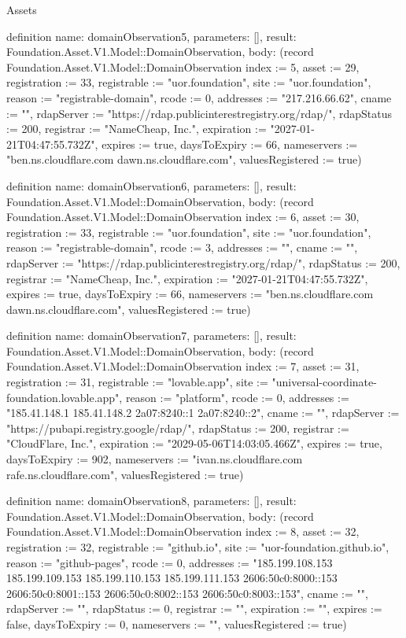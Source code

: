 \begin{lexlean}{Assets}
\begin{semanticmodule}
definition{
  name: domainObservation5,
  parameters: [],
  result: Foundation.Asset.V1.Model::DomainObservation,
  body: (record Foundation.Asset.V1.Model::DomainObservation {index := 5, asset := 29, registration := 33, registrable := "uor.foundation", site := "uor.foundation", reason := "registrable-domain", rcode := 0, addresses := "217.216.66.62", cname := "", rdapServer := "https://rdap.publicinterestregistry.org/rdap/", rdapStatus := 200, registrar := "NameCheap, Inc.", expiration := "2027-01-21T04:47:55.732Z", expires := true, daysToExpiry := 66, nameservers := "ben.ns.cloudflare.com dawn.ns.cloudflare.com", valuesRegistered := true})
}

definition{
  name: domainObservation6,
  parameters: [],
  result: Foundation.Asset.V1.Model::DomainObservation,
  body: (record Foundation.Asset.V1.Model::DomainObservation {index := 6, asset := 30, registration := 33, registrable := "uor.foundation", site := "uor.foundation", reason := "registrable-domain", rcode := 3, addresses := "", cname := "", rdapServer := "https://rdap.publicinterestregistry.org/rdap/", rdapStatus := 200, registrar := "NameCheap, Inc.", expiration := "2027-01-21T04:47:55.732Z", expires := true, daysToExpiry := 66, nameservers := "ben.ns.cloudflare.com dawn.ns.cloudflare.com", valuesRegistered := true})
}

definition{
  name: domainObservation7,
  parameters: [],
  result: Foundation.Asset.V1.Model::DomainObservation,
  body: (record Foundation.Asset.V1.Model::DomainObservation {index := 7, asset := 31, registration := 31, registrable := "lovable.app", site := "universal-coordinate-foundation.lovable.app", reason := "platform", rcode := 0, addresses := "185.41.148.1 185.41.148.2 2a07:8240::1 2a07:8240::2", cname := "", rdapServer := "https://pubapi.registry.google/rdap/", rdapStatus := 200, registrar := "CloudFlare, Inc.", expiration := "2029-05-06T14:03:05.466Z", expires := true, daysToExpiry := 902, nameservers := "ivan.ns.cloudflare.com rafe.ns.cloudflare.com", valuesRegistered := true})
}

definition{
  name: domainObservation8,
  parameters: [],
  result: Foundation.Asset.V1.Model::DomainObservation,
  body: (record Foundation.Asset.V1.Model::DomainObservation {index := 8, asset := 32, registration := 32, registrable := "github.io", site := "uor-foundation.github.io", reason := "github-pages", rcode := 0, addresses := "185.199.108.153 185.199.109.153 185.199.110.153 185.199.111.153 2606:50c0:8000::153 2606:50c0:8001::153 2606:50c0:8002::153 2606:50c0:8003::153", cname := "", rdapServer := "", rdapStatus := 0, registrar := "", expiration := "", expires := false, daysToExpiry := 0, nameservers := "", valuesRegistered := true})
}


\end{semanticmodule}
\end{lexlean}
